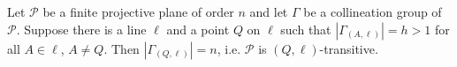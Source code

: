 Let $\mathcal{P}$ be a finite projective plane of order $n$ and let $\Gamma$ be a collineation group of $\mathcal{P}$. Suppose there is a line $\ell$ and a point $Q$ on $\ell$ such that $|\Gamma_{(A,\ell)}| = h > 1$ for all $A \in \ell$, $A \neq Q$. Then $|\Gamma_{(Q,\ell)}| = n$, i.e. $\mathcal{P}$ is $(Q,\ell)$-transitive.
